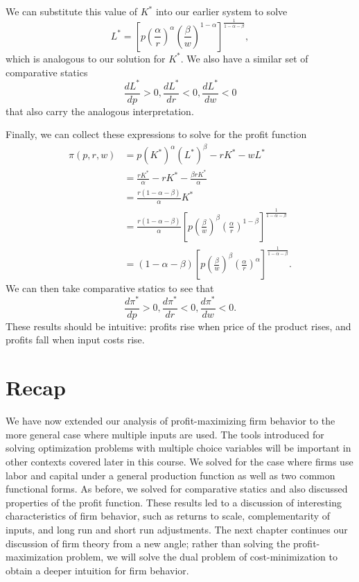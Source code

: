 We can substitute this value of $K^*$ into our earlier system to solve
$$\boxed{L^* = \left[p\left(\frac{\alpha}{r}\right)^{\alpha} \left(\frac{\beta}{w}\right)^{1-\alpha} \right]^{\frac{1}{1-\alpha-\beta}},}$$
which is analogous to our solution for $K^*$. We also have a similar set of comparative statics
$$\boxed{\frac{d L^*}{d p}>0, \frac{d L^*}{d r}<0, \frac{d L^*}{d w}<0}$$
that also carry the analogous interpretation.

Finally, we can collect these expressions to solve for the profit function
\begin{align*}
\pi(p, r, w) &= p (K^*)^{\alpha} (L^*)^{\beta} - rK^* - wL^* \\
&= \frac{rK^*}{\alpha} - rK^* - \frac{\beta r K^*}{\alpha} \\
&= \frac{r(1-\alpha-\beta)}{\alpha}K^* \\
&= \frac{r(1-\alpha-\beta)}{\alpha}\left[p\left(\frac{\beta}{w}\right)^{\beta} \left(\frac{\alpha}{r}\right)^{1-\beta} \right]^{\frac{1}{1-\alpha-\beta}} \\
&= \boxed{(1-\alpha-\beta)\left[p\left(\frac{\beta}{w}\right)^{\beta} \left(\frac{\alpha}{r}\right)^{\alpha} \right]^{\frac{1}{1-\alpha-\beta}}.}
\end{align*}
We can then take comparative statics to see that
$$\boxed{\frac{d \pi^*}{d p}>0, \frac{d \pi^*}{d r}<0, \frac{d \pi^*}{d w}<0}.$$
These results should be intuitive: profits rise when price of the product rises, and profits fall when input costs rise.


\section*{Recap}

We have now extended our analysis of profit-maximizing firm behavior to the more general case where multiple inputs are used. The tools introduced for solving optimization problems with multiple choice variables will be important in other contexts covered later in this course. We solved for the case where firms use labor and capital under a general production function as well as two common functional forms. As before, we solved for comparative statics and also discussed properties of the profit function. These results led to a discussion of interesting characteristics of firm behavior, such as returns to scale, complementarity of inputs, and long run and short run adjustments. The next chapter continues our discussion of firm theory from a new angle; rather than solving the profit-maximization problem, we will solve the dual problem of cost-minimization to obtain a deeper intuition for firm behavior.

